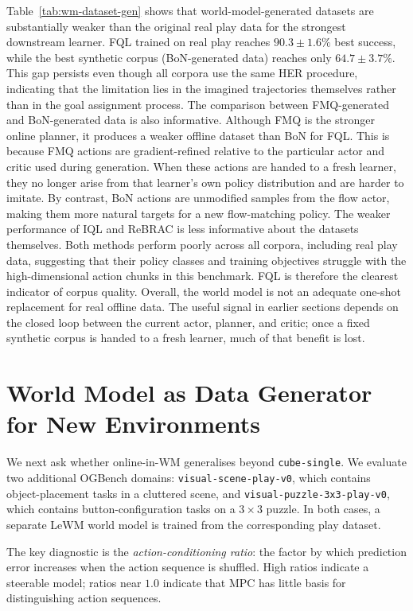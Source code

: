 Table~\ref{tab:wm-dataset-gen} shows that world-model-generated
datasets are substantially weaker than the original real play data for
the strongest downstream learner. FQL trained on real play reaches
$90.3 \pm 1.6\%$ best success, while the best synthetic corpus
(BoN-generated data) reaches only $64.7 \pm 3.7\%$. This gap persists
even though all corpora use the same HER procedure, indicating that the
limitation lies in the imagined trajectories themselves rather than in
the goal assignment process.
The comparison between FMQ-generated and BoN-generated data is also
informative. Although FMQ is the stronger online planner, it produces a
weaker offline dataset than BoN for FQL. This is because FMQ actions are
gradient-refined relative to the particular actor and critic used during
generation. When these actions are handed to a fresh learner, they no
longer arise from that learner's own policy distribution and are harder
to imitate. By contrast, BoN actions are unmodified samples from the
flow actor, making them more natural targets for a new flow-matching
policy.
The weaker performance of IQL and ReBRAC is less informative about the
datasets themselves. Both methods perform poorly across all corpora,
including real play data, suggesting that their policy classes and
training objectives struggle with the high-dimensional action chunks in
this benchmark. FQL is therefore the clearest indicator of corpus
quality.
Overall, the world model is not an adequate one-shot replacement for
real offline data. The useful signal in earlier sections depends on the
closed loop between the current actor, planner, and critic; once a fixed
synthetic corpus is handed to a fresh learner, much of that benefit is
lost.

\section{World Model as Data Generator for New Environments}
\label{sec:exp-generalisation}

We next ask whether online-in-WM generalises beyond
\texttt{cube-single}. We evaluate two additional OGBench domains:
\texttt{visual-scene-play-v0}, which contains object-placement tasks in
a cluttered scene, and \texttt{visual-puzzle-3x3-play-v0}, which
contains button-configuration tasks on a $3\times3$ puzzle. In both
cases, a separate LeWM world model is trained from the corresponding
play dataset.

The key diagnostic is the \emph{action-conditioning ratio}: the factor
by which prediction error increases when the action sequence is
shuffled. High ratios indicate a steerable model; ratios near $1.0$
indicate that MPC has little basis for distinguishing action sequences.

